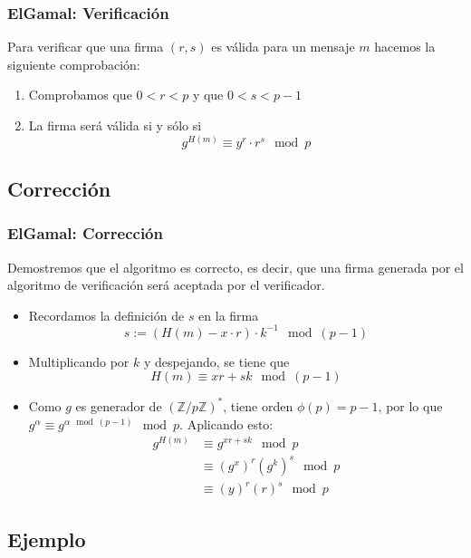 \documentclass{beamer}
\begin{document}
\begin{frame}
    \frametitle{ElGamal: Verificación}

    Para verificar que una firma $(r, s)$ es válida para un mensaje $m$ hacemos la siguiente comprobación:
    \begin{enumerate}
        \item Comprobamos que $0 < r < p$ y que $0 < s < p-1$
        \item La firma será válida si y sólo si $$ g^{H(m)} \equiv y^r \cdot r^s \mod p$$
    \end{enumerate}

\end{frame}

\subsection{Corrección}

\begin{frame}
    \frametitle{ElGamal: Corrección}

    Demostremos que el algoritmo es correcto, es decir, que una firma generada por el algoritmo de verificación será aceptada por el verificador.

    \begin{itemize}
        \item Recordamos la definición de $s$ en la firma $$s := \left( H(m) - x \cdot r  \right) \cdot k^{-1} \mod \left(p-1\right)$$
        \item Multiplicando por $k$ y despejando, se tiene que $$ H(m) \equiv x r + s k  \mod \left(p-1\right) $$
        \item Como $g$ es generador de ${\left(\mathbb{Z}/p\mathbb{Z} \right)}^{*}$, tiene orden $\phi(p)=p-1$, por lo que $g^{\alpha} \equiv g^{\alpha \mod \left(p-1\right)} \mod p$. Aplicando esto:
        \begin{align*}
            g^{H(m)} & \equiv g^{x r + s k} \mod p  \\
                     & \equiv \left(g^{x}\right)^r \left(g^k\right)^s \mod p \\
                     & \equiv \left(y\right)^r \left(r\right)^s \mod p
        \end{align*}
    \end{itemize}    
\end{frame}

\subsection{Ejemplo}
\end{document}
